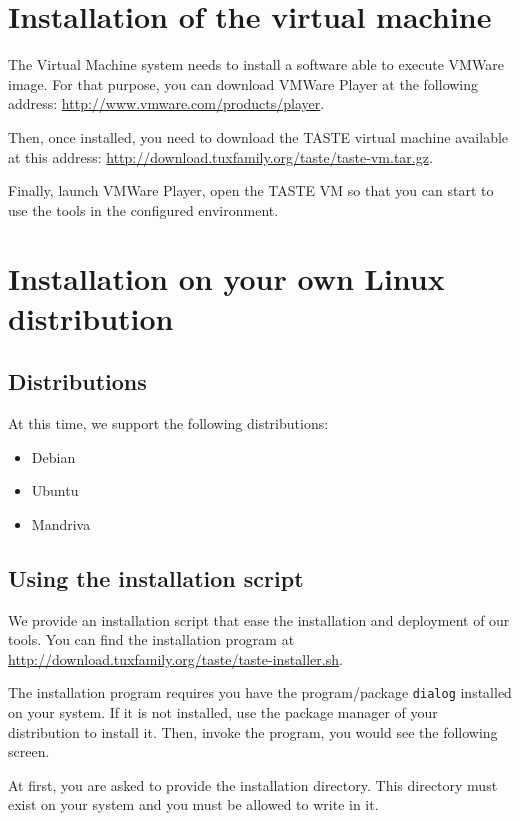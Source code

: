 \documentclass[11pt]{book}
\begin{document}
   \section{Installation of the virtual machine}
   The Virtual Machine system needs to install a software able to execute VMWare
   image. For that purpose, you can download VMWare Player at the following
   address: \url{http://www.vmware.com/products/player}.

   Then, once installed, you need to download the TASTE virtual machine
   available at this address:
   \url{http://download.tuxfamily.org/taste/taste-vm.tar.gz}.

   Finally, launch VMWare Player, open the TASTE VM so that you can start to use
   the tools in the configured environment.


   \section{Installation on your own Linux distribution}
      \subsection{Distributions}
      At this time, we support the following distributions:
      \begin{itemize}
         \item
            Debian
         \item
            Ubuntu
         \item
            Mandriva
      \end{itemize}

      \subsection{Using the installation script}
      We provide an installation script that ease the installation and deployment
      of our tools. You can find the installation program at
      \url{http://download.tuxfamily.org/taste/taste-installer.sh}.

      The installation program requires you have the program/package
      \texttt{dialog} installed on your system. If it is not installed, use the
      package manager of your distribution to install it. Then, invoke the
      program, you would see the following screen.

     \centerline{}

     At first, you are asked to provide the installation directory. This
     directory must exist on your system and you must be allowed to write in it.
\end{document}
